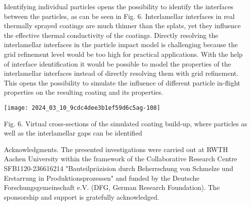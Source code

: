 \documentclass[10pt]{article}
\begin{document}
Identifying individual particles opens the possibility to identify the interfaces between the particles, as can be seen in Fig. 6. Interlamellar interfaces in real thermally sprayed coatings are much thinner than the splats, yet they influence the effective thermal conductivity of the coatings. Directly resolving the interlamellar interfaces in the particle impact model is challenging because the grid refinement level would be too high for practical applications. With the help of interface identification it would be possible to model the properties of the interlamellar interfaces instead of directly resolving them with grid refinement. This opens the possibility to simulate the influence of different particle in-flight properties on the resulting coating and its properties.

\begin{center}
\texttt{[image: 2024\_03\_10\_9cdc4dee3b1ef59d6c5ag-108]}
\end{center}

Fig. 6. Virtual cross-sections of the simulated coating build-up, where particles as well as the interlamellar gaps can be identified

Acknowledgments. The presented investigations were carried out at RWTH Aachen University within the framework of the Collaborative Research Centre SFB1120-236616214 "Bauteilpräzision durch Beherrschung von Schmelze und Erstarrung in Produktionsprozessen" and funded by the Deutsche Forschungsgemeinschaft e.V. (DFG, German Research Foundation). The sponsorship and support is gratefully acknowledged.
\end{document}
